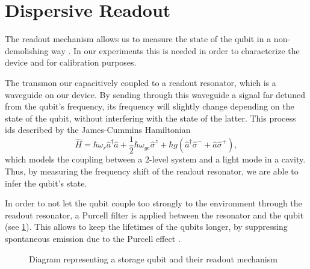 \section{Dispersive Readout}
\label{sec:readout}

The readout mechanism allows us to measure the state of the qubit in a non-demolishing way \cite{singleshot_readout}.
In our experiments this is needed in order to characterize the device and for calibration purposes.

The transmon our capacitively coupled to a readout resonator, which is a waveguide on our device.
By sending through this waveguide a signal far detuned from the qubit's frequency, its frequency will slightly change depending on the state of the qubit, without interfering with the state of the latter.
This process ids described by the James-Cummins Hamiltonian
\begin{equation}
    \hat{H} = \hbar \omega_r \hat{a}^\dagger \hat{a} + \frac{1}{2} \hbar \omega_{ge} \hat{\sigma}^z + \hbar g (\hat{a}^\dagger \hat{\sigma}^- + \hat{a} \hat{\sigma}^+) ,
\end{equation}
which models the coupling between a 2-level system and a light mode in a cavity.
Thus, by measuring the frequency shift of the readout resonator, we are able to infer the qubit's state.

In order to not let the qubit couple too strongly to the environment through the readout resonator, a Purcell filter is applied between the resonator and the qubit (see \cref{fig:diagram_storage_qubit}).
This allows to keep the lifetimes of the qubits longer, by suppressing spontaneous emission due to the Purcell effect \cite{Purcell_effect}.

\begin{figure}
    \centering
    
    \vspace{-1cm}
    \caption{Diagram representing a storage qubit and their readout mechanism}
    \label{fig:diagram_storage_qubit}
\end{figure}
